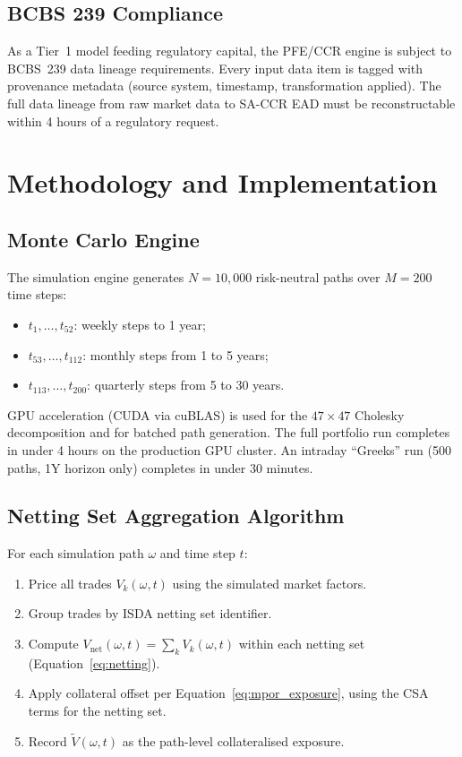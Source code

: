 \documentclass[11pt,a4paper]{article}
\begin{document}
\subsection{BCBS 239 Compliance}

As a Tier~1 model feeding regulatory capital, the PFE/CCR engine is subject to
BCBS~239 data lineage requirements. Every input data item is tagged with
provenance metadata (source system, timestamp, transformation applied).
The full data lineage from raw market data to SA-CCR EAD must be
reconstructable within 4 hours of a regulatory request.

\section{Methodology and Implementation}

\subsection{Monte Carlo Engine}

The simulation engine generates $N = 10{,}000$ risk-neutral paths over
$M = 200$ time steps:

\begin{itemize}[noitemsep]
  \item $t_1, \ldots, t_{52}$: weekly steps to 1 year;
  \item $t_{53}, \ldots, t_{112}$: monthly steps from 1 to 5 years;
  \item $t_{113}, \ldots, t_{200}$: quarterly steps from 5 to 30 years.
\end{itemize}

GPU acceleration (CUDA via cuBLAS) is used for the $47 \times 47$ Cholesky
decomposition and for batched path generation. The full portfolio run completes
in under 4 hours on the production GPU cluster. An intraday ``Greeks'' run
(500 paths, 1Y horizon only) completes in under 30 minutes.

\subsection{Netting Set Aggregation Algorithm}

For each simulation path $\omega$ and time step $t$:

\begin{enumerate}[noitemsep]
  \item Price all trades $V_k(\omega, t)$ using the simulated market factors.
  \item Group trades by ISDA netting set identifier.
  \item Compute $V_{\text{net}}(\omega, t) = \sum_k V_k(\omega, t)$ within
        each netting set (Equation~\ref{eq:netting}).
  \item Apply collateral offset per Equation~\ref{eq:mpor_exposure}, using
        the CSA terms for the netting set.
  \item Record $\tilde{V}(\omega, t)$ as the path-level collateralised exposure.
\end{enumerate}
\end{document}
